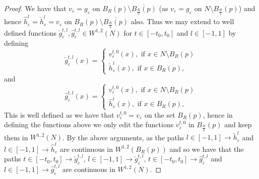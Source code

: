 \documentclass[11pt]{article}
\begin{document}
\begin{proof}
We have that $v_\varepsilon = g_\varepsilon$ on $B_R(p) \setminus \overline{B_\frac{R}{2}(p)}$ (as $v_\varepsilon = g_\varepsilon$ on $N \setminus B_\frac{R}{2}(p)$) and hence $\hat{h}^l_\varepsilon = \check{h}^l_\varepsilon = v_\varepsilon$ on $B_R(p) \setminus \overline{B_\frac{R}{2}(p)}$ also. Thus we may extend to well defined functions $\check{g}^{t,l}_\varepsilon, \hat{g}^{t,l}_\varepsilon \in W^{1,2}(N)$ for $t \in [-t_0,t_0]$ and $l \in [-1,1]$ by defining
\begin{equation*}
    \check{g}^{t,l}_\varepsilon(x) = 
    \begin{cases}
    v^{t,0}_\varepsilon(x), \text{ if } x \in N \setminus B_R(p)\\
    \check{h}^l_\varepsilon(x), \text{ if } x \in B_R(p),
    \end{cases}
\end{equation*}
and
\begin{equation*}
    \hat{g}^{t,l}_\varepsilon(x) = 
    \begin{cases}
    v^{t,0}_\varepsilon(x), \text{ if } x \in N \setminus B_R(p)\\
    \hat{h}^l_\varepsilon(x), \text{ if } x \in B_R(p),
    \end{cases}
\end{equation*}
This is well defined as we have that $v^{t,0}_\varepsilon = v_\varepsilon$ on the set $B_R(p)$, hence in defining the functions above we only edit the functions $v_\varepsilon^{t,0}$ in $B_{\frac{R}{2}}(p)$ and keep them in $W^{1,2}(N)$. By the above arguments, as the paths $l \in [-1,1] \rightarrow \check{h}^l_\varepsilon$ and $l \in [-1,1] \rightarrow \hat{h}^l_\varepsilon$ are continuous in $W^{1,2}(B_R(p))$ and so we have that the paths $t \in [-t_0,t_0] \rightarrow \check{g}^{t,l}_\varepsilon$, $l \in [-1,1] \rightarrow \check{g}^{t,l}_\varepsilon$, $t \in [-t_0,t_0] \rightarrow \hat{g}^{t,l}_\varepsilon$ and $l \in [-1,1] \rightarrow \hat{g}^{t,l}_\varepsilon$ are continuous in $W^{1,2}(N)$. 

\bigskip


\end{proof}
\end{document}

